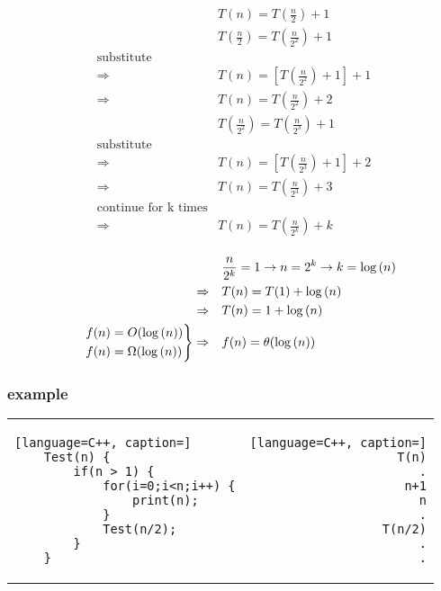 \documentclass[12pt]{article}
\begin{document}
\begin{align*}
&T(n) = T(\frac{n}{2}) + 1 \\
&T(\frac{n}{2}) = T(\frac{n}{2^{2}}) + 1 \\
\text{substitute}& \\
\Rightarrow \quad &T(n) = [ T(\frac{n}{2^{2}}) + 1 ] + 1 \\
\Rightarrow \quad &T(n) = T(\frac{n}{2^{2}}) + 2 \\
&T(\frac{n}{2^{2}}) = T(\frac{n}{2^{3}}) + 1 \\
\text{substitute} \\
\Rightarrow \quad &T(n) = [ T(\frac{n}{2^{3}}) + 1 ] + 2 \\
\Rightarrow \quad &T(n) =  T(\frac{n}{2^{3}}) + 3 \\
\text{continue for k times}& \\
\Rightarrow \quad &T(n) =  T(\frac{n}{2^{k}}) + k \\
\end{align*}



\begin{align*}
&\frac{n}{2^{k}} = 1 \to n = 2^{k} \to k = \log{(n)}  \\
\Rightarrow \quad &T(n) =  T(1) + \log{(n)} \\
\Rightarrow \quad &T(n) = 1 + \log{(n)} \\
\begin{rcases}
&f(n) = O(\log{(n)}) \\
&f(n) = \Omega(\log{(n)}) 
\end{rcases}
\Rightarrow \quad &f(n) = \theta(\log{(n)}) 
\end{align*}










\subsubsection{example}




\begin{center}
  \bgroup
  \def\arraystretch{1.5}%
  \begin{tabular}{ E  D  }
	\begin{lstlisting}[language=C++, caption=]
	Test(n) {
		if(n > 1) {
			for(i=0;i<n;i++) {
				print(n);
			}
			Test(n/2);
		}
	}
	\end{lstlisting}
     &  
	\begin{lstlisting}[language=C++, caption=]
	T(n)
	.
	n+1
	n
	.
	T(n/2)
	.
	.
	\end{lstlisting}
  \end{tabular}
  \egroup
\end{center}
\end{document}
